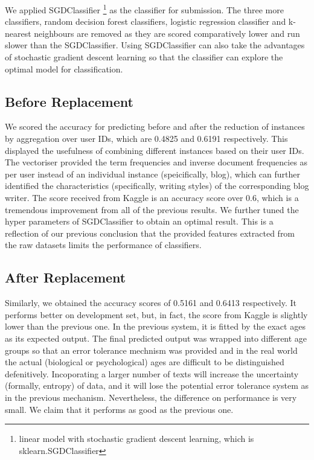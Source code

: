 \documentclass[10pt]{article}
\begin{document}
We applied SGDClassifier
\footnote{linear model with stochastic gradient descent learning, which is sklearn.SGDClassifier}
as the classifier for submission. The three more classifiers, random decision forest classifiers, logistic regression classifier and k-nearest neighbours are removed as they are scored comparatively lower and run slower than the SGDClassifier. Using SGDClassifier can also take the advantages of stochastic gradient descent learning so that the classifier can explore the optimal model for classification.

\subsection{Before Replacement}
\justify

We scored the accuracy for predicting before and after the reduction of instances by aggregation over user IDs, which are 0.4825 and 0.6191 respectively. This displayed the usefulness of combining different instances based on their user IDs. The vectoriser provided the term frequencies and inverse document frequencies as per user instead of an individual instance (speicifically, blog), which can further identified the characteristics (specifically, writing styles) of the corresponding blog writer. The score received from Kaggle is an accuracy score over 0.6, which is a tremendous improvement from all of the previous results. We further tuned the hyper parameters of SGDClassifier to obtain an optimal result. This is a reflection of our previous conclusion that the provided features extracted from the raw datasets limits the performance of classifiers.

\subsection{After Replacement}
\justify

Similarly, we obtained the accuracy scores of 0.5161 and 0.6413 respectively. It performs better on development set, but, in fact, the score from Kaggle is slightly lower than the previous one. In the previous system, it is fitted by the exact ages as its expected output. The final predicted output was wrapped into different age groups so that an error tolerance mechnism was provided and in the real world the actual (biological or psychological) ages are difficult to be distinguished defenitively. Incoporating a larger number of texts will increase the uncertainty (formally, entropy) of data, and it will lose the potential error tolerance system as in the previous mechanism. Nevertheless, the difference on performance is very small. We claim that it performs as good as the previous one.
\end{document}
